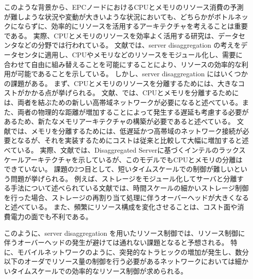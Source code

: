 \documentclass[a4j]{ujarticle}
\begin{document}
このような背景から、EPCノードにおけるCPUとメモリのリソース消費の予測が難しような状況や変動が大きいような状況においても、どちらかがボトルネックにならずに、効率的にリソースを活用するアーキテクチャを考えることは重要である。
実際、CPUとメモリのリソースを効率よく活用する研究は、データセンタなどの分野では行われている。
文献\cite{TechnoEconomicFrameworkforCloudInfrastructureACostStudyofResourceDisaggregation}では、server disaggregation の考えをデータセンタに適用し、CPUやメモリなどのリソースをモジュール化し、需要に合わせて自由に組み替えることを可能にすることにより、リソースの効率的な利用が可能であることを示している。
しかし、server disaggregation にはいくつかの課題がある。
まず、CPUとメモリのリソースを分離するためには、大きなコストがかかる点が挙げられる。
文献\cite{IntelsDisaggregatedServerRack}、\cite{EnhancedBackoffTimerSolutionforGTPCOverloadControl}では、CPUとメモリを分離するためには、両者を結ぶための新しい高帯域ネットワークが必要になると述べている。また、両者の物理的な距離が増加することによって発生する遅延も考慮する必要があるため、新たなメモリアーキテクチャの構築が必要であると述べている。
文献\cite{DisaggregatedandOpticallyInterconnectedMemoryWhenwillitbecosteffective}では、メモリを分離するためには、低遅延かつ高帯域のネットワーク接続が必要となるが、それを実装するためにコストは従来と比較して大幅に増加すると述べている。
実際、文献\cite{DisaggregatedServersDriveDataCenterEfficiencyandInnovation}では、Disaggregated Serverに基づくインテルのラックスケールアーキテクチャを示しているが、このモデルでもCPUとメモリの分離はできていない。
課題の2つ目として、短いタイムスケールでの制御が難しいという問題が挙げられる。
例えば、ストレージをモジュール化してサーバと分離する手法について述べられている文献\cite{UnderstandingRackScaleDisaggregatedStorage}では、時間スケールの細かいストレージ制御を行った場合、ストレージの再割り当て処理に伴うオーバーヘッドが大きくなると述べている。
また、頻繁にリソース構成を変化させることは、コスト面や消費電力の面でも不利である。

このように、server disaggregation を用いたリソース制御では、リソース制御に伴うオーバーヘッドの発生が避けては通れない課題となると予想される。
特に、モバイルネットワークのように、突発的なトラヒックの増加が発生し、数分以下のオーダでリソース量の制御を行う必要があるネットワークにおいては細かいタイムスケールでの効率的なリソース制御が求められる。
\end{document}
